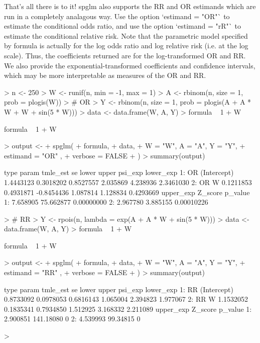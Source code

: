 \documentclass{article}
\begin{document}
That's all there is to it! spglm also supports the RR and OR estimands which are run in a completely analagous way. Use the option `estimand = "OR"` to estimate the conditional odds ratio, and use the option `estimand = "rR"` to estimate the conditional relative risk. Note that the parametric model specified by formula is actually for the log odds ratio and log relative risk (i.e. at the log scale). Thus, the coefficients returned are for the log-transformed OR and RR. We also provide the exponential-transformed coefficients and confidence intervals, which may be more interpretable as measures of the OR and RR.

\begin{Schunk}
\begin{Sinput}
> n <- 250
> W <- runif(n, min = -1,  max = 1)
> A <- rbinom(n, size = 1, prob = plogis(W))
> # OR
> Y <- rbinom(n, size =  1, prob = plogis(A + A * W + W + sin(5 * W)))
> data <- data.frame(W, A, Y)
> formula ~ 1 + W
\end{Sinput}
\begin{Soutput}
formula ~ 1 + W
\end{Soutput}
\begin{Sinput}
> output <-
+   spglm(
+     formula,
+     data,
+     W = "W", A = "A", Y = "Y",
+     estimand = "OR" ,
+     verbose = FALSE
+   )
> summary(output)
\end{Sinput}
\begin{Soutput}
   type       param  tmle_est        se      lower    upper  psi_exp lower_exp
1:   OR (Intercept) 1.4443123 0.3018202  0.8527557 2.035869 4.238936 2.3461030
2:   OR           W 0.1211853 0.4931871 -0.8454436 1.087814 1.128834 0.4293669
   upper_exp   Z_score    p_value
1:  7.658905 75.662877 0.00000000
2:  2.967780  3.885155 0.00010226
\end{Soutput}
\begin{Sinput}
> # RR
> Y <- rpois(n, lambda = exp(A + A * W + sin(5 * W)))
> data <- data.frame(W, A, Y)
> formula ~ 1 + W
\end{Sinput}
\begin{Soutput}
formula ~ 1 + W
\end{Soutput}
\begin{Sinput}
> output <-
+   spglm(
+     formula,
+     data,
+     W = "W", A = "A", Y = "Y",
+     estimand = "RR" ,
+     verbose = FALSE
+   )
> summary(output)
\end{Sinput}
\begin{Soutput}
   type       param  tmle_est        se     lower    upper  psi_exp lower_exp
1:   RR (Intercept) 0.8733092 0.0978053 0.6816143 1.065004 2.394823  1.977067
2:   RR           W 1.1532052 0.1835341 0.7934850 1.512925 3.168332  2.211089
   upper_exp   Z_score p_value
1:  2.900851 141.18080       0
2:  4.539993  99.34815       0
\end{Soutput}
\begin{Sinput}
> 
\end{Sinput}
\end{Schunk}
\end{document}
